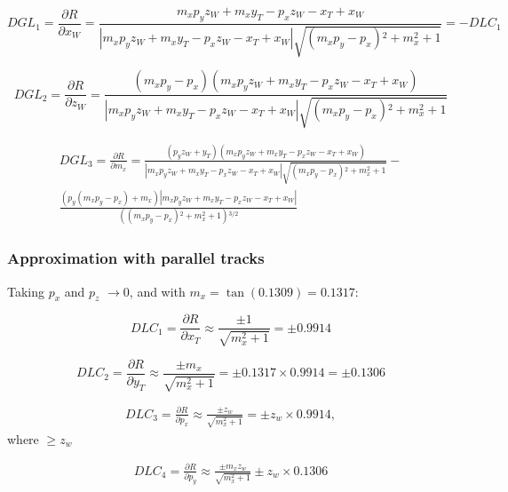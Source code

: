 \documentclass[a4paper,11pt]{article}
\begin{document}
\begin{equation}	
DGL_1 = \frac{\partial R}{\partial x_W} = \frac{m_x p_y z_W+m_x y_T-p_x z_W-x_T+x_W}{|m_x p_y z_W+m_x y_T-p_x z_W-x_T+x_W|\sqrt{\left(m_x p_y-p_x\right){}^2+m_x^2+1}} = - DLC_1
\end{equation}

\begin{equation}	
DGL_2 = \frac{\partial R}{\partial z_W} = \frac{(m_x p_y-p_x) (m_x p_y z_W+m_x y_T-p_x z_W-x_T+x_W)}{|m_x p_y z_W+m_x y_T-p_x z_W-x_T+x_W|\sqrt{\left(m_x p_y-p_x\right){}^2+m_x^2+1}}
\end{equation}

\begin{equation}
\begin{split}	
DGL_3 = \frac{\partial R}{\partial m_x} = \frac{(p_y z_W+y_T)(m_x p_y z_W+m_x y_T-p_x z_W-x_T+x_W)}{|m_x p_y z_W+m_x y_T-p_x z_W-x_T+x_W|\sqrt{\left(m_x p_y-p_x\right){}^2+m_x^2+1}}-\\
\frac{\left(p_y \left(m_x p_y-p_x\right)+ m_x\right) |m_x p_y z_W+m_x y_T-p_x z_W-x_T+x_W|}{ \left(\left(m_x p_y-p_x\right){}^2+m_x^2+1\right){}^{3/2}}
\end{split}
\end{equation}

\subsubsection{Approximation with parallel tracks}

Taking $p_x$ and $p_z$ $\rightarrow 0$, and with $m_x = \tan(0.1309)=0.1317$:

\begin{equation}
DLC_1 = \frac{\partial R}{\partial x_T} \approx   \frac{\pm1}{\sqrt{m_x^2+1}} = \pm 0.9914
\end{equation}

\begin{equation}
DLC_2 = \frac{ \partial R}{\partial y_T} \approx  \frac{\pm m_x}{\sqrt{m_x^2+1}} = \pm 0.1317 \times 0.9914 = \pm 0.1306
\end{equation}


\begin{equation}
\begin{split}
DLC_3 = \frac{ \partial R}{\partial p_x} \approx \frac{\pm z_w}{\sqrt{m_x^2+1}} = \pm z_w \times 0.9914,
\end{split}
\end{equation}
where $ \geq z_w$

\begin{equation}
\begin{split}
DLC_4 = \frac{ \partial R}{\partial p_y} \approx \frac{\pm m_x z_w}{\sqrt{m_x^2+1}} \pm z_w \times 0.1306 
\end{split}
\end{equation}
\end{document}
